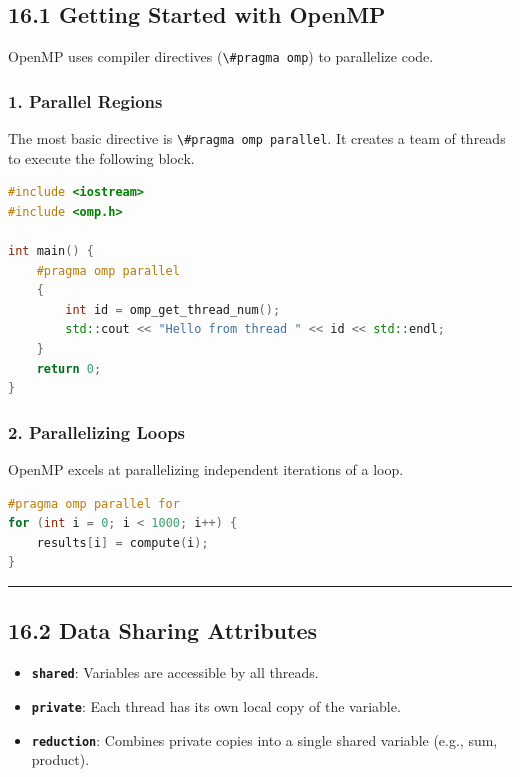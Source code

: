 \hypertarget{getting-started-with-openmp}{%
\subsection{16.1 Getting Started with
OpenMP}\label{getting-started-with-openmp}}

OpenMP uses compiler directives (\passthrough{\lstinline!\#pragma omp!})
to parallelize code.

\hypertarget{parallel-regions}{%
\subsubsection{1. Parallel Regions}\label{parallel-regions}}

The most basic directive is
\passthrough{\lstinline!\#pragma omp parallel!}. It creates a team of
threads to execute the following block.

\begin{lstlisting}[language={C++}]
#include <iostream>
#include <omp.h>

int main() {
    #pragma omp parallel
    {
        int id = omp_get_thread_num();
        std::cout << "Hello from thread " << id << std::endl;
    }
    return 0;
}
\end{lstlisting}

\hypertarget{parallelizing-loops}{%
\subsubsection{2. Parallelizing Loops}\label{parallelizing-loops}}

OpenMP excels at parallelizing independent iterations of a loop.

\begin{lstlisting}[language={C++}]
#pragma omp parallel for
for (int i = 0; i < 1000; i++) {
    results[i] = compute(i);
}
\end{lstlisting}

\begin{center}\rule{0.5\linewidth}{0.5pt}\end{center}

\hypertarget{data-sharing-attributes}{%
\subsection{16.2 Data Sharing
Attributes}\label{data-sharing-attributes}}

\begin{itemize}
\tightlist
\item
  \textbf{\passthrough{\lstinline!shared!}}: Variables are accessible by
  all threads.
\item
  \textbf{\passthrough{\lstinline!private!}}: Each thread has its own
  local copy of the variable.
\item
  \textbf{\passthrough{\lstinline!reduction!}}: Combines private copies
  into a single shared variable (e.g., sum, product).
\end{itemize}


